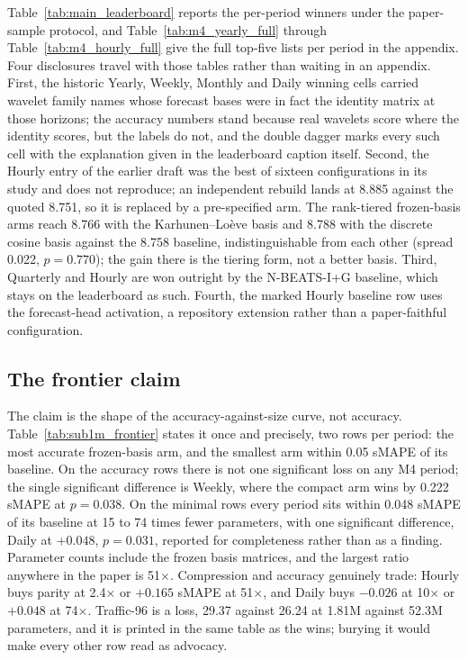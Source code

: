 Table~\ref{tab:main_leaderboard} reports the per-period winners under
the paper-sample protocol, and Table~\ref{tab:m4_yearly_full} through
Table~\ref{tab:m4_hourly_full} give the full top-five lists per period
in the appendix. Four disclosures travel with those tables rather than
waiting in an appendix. First, the historic Yearly, Weekly, Monthly and
Daily winning cells carried wavelet family names whose forecast bases
were in fact the identity matrix at those horizons; the accuracy numbers
stand because real wavelets score where the identity scores, but the
labels do not, and the double dagger marks every such cell with the
explanation given in the leaderboard caption itself. Second, the Hourly
entry of the earlier draft was the best of sixteen configurations in its
study and does not reproduce; an independent rebuild lands at 8.885
against the quoted 8.751, so it is replaced by a pre-specified arm. The
rank-tiered frozen-basis arms reach 8.766 with the Karhunen--Lo\`eve
basis and 8.788 with the discrete cosine basis against the 8.758
baseline, indistinguishable from each other (spread 0.022,
$p = 0.770$); the gain there is the tiering form, not a better basis.
Third, Quarterly and Hourly are won outright by the N-BEATS-I+G
baseline, which stays on the leaderboard as such. Fourth, the marked
Hourly baseline row uses the forecast-head activation, a repository
extension rather than a paper-faithful configuration.

\subsection{The frontier claim}
\label{sec:results:frontier}

The claim is the shape of the accuracy-against-size curve, not accuracy.
Table~\ref{tab:sub1m_frontier} states it once and precisely, two rows
per period: the most accurate frozen-basis arm, and the smallest arm
within 0.05 sMAPE of its baseline. On the accuracy rows there is not one
significant loss on any M4 period; the single significant difference is
Weekly, where the compact arm wins by 0.222 sMAPE at $p = 0.038$. On the
minimal rows every period sits within 0.048 sMAPE of its baseline at
15 to 74 times fewer parameters, with one significant difference, Daily
at $+0.048$, $p = 0.031$, reported for completeness rather than as a
finding. Parameter counts include the frozen basis matrices, and the
largest ratio anywhere in the paper is 51$\times$. Compression and
accuracy genuinely trade: Hourly buys parity at 2.4$\times$ or
$+0.165$ sMAPE at 51$\times$, and Daily buys $-0.026$ at 10$\times$ or
$+0.048$ at 74$\times$. Traffic-96 is a loss, 29.37 against 26.24 at
1.81M against 52.3M parameters, and it is printed in the same table as
the wins; burying it would make every other row read as advocacy.

